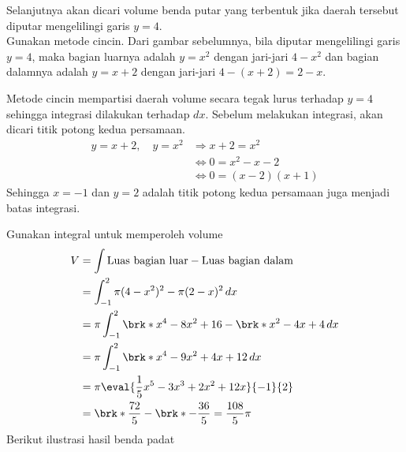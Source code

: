 \begin{enumerate}[leftmargin=*, label={\arabic*}.]
\begin{center}
\end{center}
Selanjutnya akan dicari volume benda putar yang terbentuk jika daerah tersebut diputar 
mengelilingi garis $y=4$.\\
Gunakan metode cincin. Dari gambar sebelumnya, bila diputar mengelilingi garis $y=4$, maka bagian 
luarnya adalah $y=x^{2}$ dengan jari-jari $4-x^{2}$ dan bagian dalamnya adalah $y=x+2$ dengan 
jari-jari $4-(x+2)=2-x$. 

Metode cincin mempartisi daerah volume secara tegak lurus terhadap $y=4$ 
sehingga integrasi dilakukan terhadap $dx$. Sebelum melakukan integrasi, akan dicari titik potong 
kedua persamaan.
\begin{align*}
    y = x+2,\quad y = x^{2} &\Longrightarrow x+2= x^{2}\\
    &\iff 0 = x^{2}-x-2\\
    &\iff 0 = (x-2)(x+1)
\end{align*}
Sehingga $x = -1$ dan $y=2$ adalah titik potong kedua persamaan juga menjadi batas integrasi.

Gunakan integral untuk memperoleh volume
\begin{align*}
    V &= \int \text{Luas bagian luar} - \text{Luas bagian dalam}\\
    &=\int_{-1}^{2} \pi(4-x^2)^2 - \pi(2-x)^{2}\,dx \\
    &=\pi\int_{-1}^{2} \brk*{x^{4}-8x^{2}+16} - \brk*{x^{2}-4x+4}\,dx \\
    &=\pi\int_{-1}^{2} \brk*{x^{4}-9x^{2}+4x+12}\,dx \\
    &=\pi\eval{\frac{1}{5}x^{5}-3x^{3}+2x^{2}+12x}{-1}{2} \\
    &= \brk*{\frac{72}{5}-\brk*{-\frac{36}{5}}}=\frac{108}{5}\pi
\end{align*}
Berikut ilustrasi hasil benda padat
\begin{center}
\end{center}
\end{enumerate}
